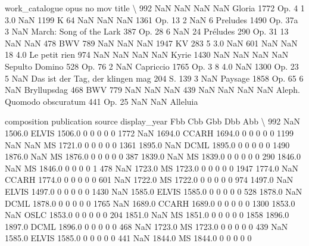 \documentclass[letterpaper,10pt,english]{sphinxmanual}
\begin{document}
{\begin{sphinxVerbatim}[commandchars=\\\{\}]
     work\_catalogue opus   no  mov                             title  \textbackslash{}
992             NaN  NaN  NaN  NaN                            Gloria
1772           Op.     4    1  3.0                               NaN
1199              K   64  NaN  NaN                               NaN
1361            Op.   13    2  NaN                        6 Preludes
1490            Op.  37a    3  NaN           March: Song of the Lark
387             Op.   28    6  NaN                       24 Préludes
290             Op.   31   13  NaN                               NaN
478             BWV  789  NaN  NaN                               NaN
1947             KV  283    5  3.0                               NaN
601             NaN  NaN   18  4.0                     Le petit rien
974             NaN  NaN  NaN  NaN                             Kyrie
1430            NaN  NaN  NaN  NaN                    Sepulto Domino
528             Op.   76    2  NaN                         Capriccio
1765           Op.     3    8  4.0                               NaN
1300            Op.   23    5  NaN  Das ist der Tag, der klingen mag
204              S.  139    3  NaN                           Paysage
1858            Op.   65    6  NaN                       Bryllupsdag
468             BWV  779  NaN  NaN                               NaN
439             NaN  NaN  NaN  NaN         Aleph. Quomodo obscuratum
441             Op.   25  NaN  NaN                          Alleluia

      composition  publication source  display\_year  Fbb  Cbb  Gbb  Dbb  Abb  \textbackslash{}
992           NaN       1506.0  ELVIS        1506.0    0    0    0    0    0
1772          NaN       1694.0  CCARH        1694.0    0    0    0    0    0
1199          NaN          NaN     MS        1721.0    0    0    0    0    0
1361       1895.0          NaN   DCML        1895.0    0    0    0    0    0
1490       1876.0          NaN     MS        1876.0    0    0    0    0    0
387        1839.0          NaN     MS        1839.0    0    0    0    0    0
290        1846.0          NaN     MS        1846.0    0    0    0    0    1
478           NaN       1723.0     MS        1723.0    0    0    0    0    0
1947       1774.0          NaN  CCARH        1774.0    0    0    0    0    0
601           NaN       1722.0     MS        1722.0    0    0    0    0    0
974        1497.0          NaN  ELVIS        1497.0    0    0    0    0    0
1430          NaN       1585.0  ELVIS        1585.0    0    0    0    0    0
528        1878.0          NaN   DCML        1878.0    0    0    0    0    0
1765          NaN       1689.0  CCARH        1689.0    0    0    0    0    0
1300       1853.0          NaN   OSLC        1853.0    0    0    0    0    0
204        1851.0          NaN     MS        1851.0    0    0    0    0    0
1858       1896.0       1897.0   DCML        1896.0    0    0    0    0    0
468           NaN       1723.0     MS        1723.0    0    0    0    0    0
439           NaN       1585.0  ELVIS        1585.0    0    0    0    0    0
441           NaN       1844.0     MS        1844.0    0    0    0    0    0


\end{sphinxVerbatim}}
\end{document}
